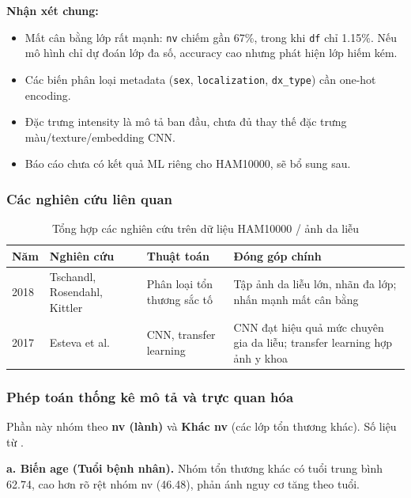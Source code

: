 \textbf{Nhận xét chung:}
\begin{itemize}
 \item Mất cân bằng lớp rất mạnh: \texttt{nv} chiếm gần 67\%, trong khi \texttt{df} chỉ 1.15\%. Nếu mô hình chỉ dự đoán lớp đa số, accuracy cao nhưng phát hiện lớp hiếm kém.
 \item Các biến phân loại metadata (\texttt{sex}, \texttt{localization}, \texttt{dx\_type}) cần one-hot encoding.
 \item Đặc trưng intensity là mô tả ban đầu, chưa đủ thay thế đặc trưng màu/texture/embedding CNN.
 \item Báo cáo chưa có kết quả ML riêng cho HAM10000, sẽ bổ sung sau.
\end{itemize}

\subsubsection{Các nghiên cứu liên quan}

\begin{table}[H]
\centering
\caption{Tổng hợp các nghiên cứu trên dữ liệu HAM10000 / ảnh da liễu}
\label{tab:ham_research_review}
\small
\begin{tabular}{p{}p{}p{}p{}}
\toprule
Năm & Nghiên cứu & Thuật toán & Đóng góp chính \\
\midrule
2018 & Tschandl, Rosendahl, Kittler \cite{Tschandl2018HAM10000} & Phân loại tổn thương sắc tố & Tập ảnh da liễu lớn, nhãn đa lớp; nhấn mạnh mất cân bằng \\
2017 & Esteva et al. \cite{Esteva2017Dermatologist} & CNN, transfer learning & CNN đạt hiệu quả mức chuyên gia da liễu; transfer learning hợp ảnh y khoa \\
\bottomrule
\end{tabular}
\end{table}

\subsubsection{Phép toán thống kê mô tả và trực quan hóa}

Phần này nhóm theo \textbf{nv (lành)} và \textbf{Khác nv} (các lớp tổn thương khác). Số liệu từ .

\textbf{a. Biến age (Tuổi bệnh nhân).} Nhóm tổn thương khác có tuổi trung bình 62.74, cao hơn rõ rệt nhóm nv (46.48), phản ánh nguy cơ tăng theo tuổi.

